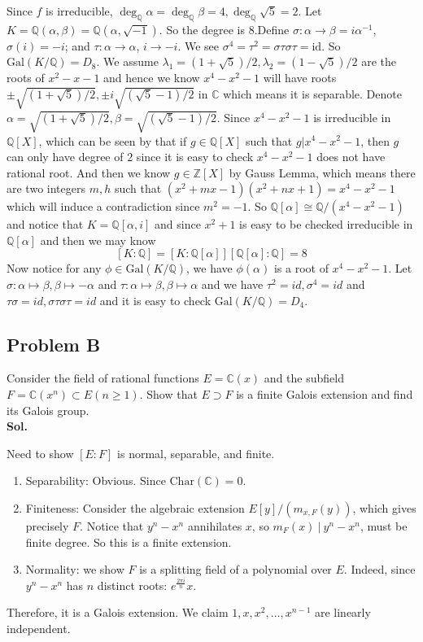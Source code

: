 \documentclass[lang=en,11pt,a4paper,citestyle =authoryear]{elegantpaper}
\newcommand{\Q}{\mathbb{Q}}
\begin{document}
Since $f$ is irreducible, $\deg_\Q\alpha=\deg_{\Q}\beta=4, \deg_\Q\sqrt{5}=2$. Let $K=\Q(\alpha,\beta)=\Q(\alpha,\sqrt{-1})$. So the degree is $8$.Define $\sigma: \alpha\rightarrow \beta=i\alpha^{-1}$, $\sigma(i)=-i$; and $\tau: \alpha\rightarrow\alpha$, $i\rightarrow -i$. 
We see $\sigma^4=\tau^2=\sigma\tau\sigma\tau=\text{id}$. So $\text{Gal}(K/\mathbb Q)=D_8$.
\fi
We assume $\lambda_1 = (1+\sqrt{5})/2,\lambda_2 = (1-\sqrt{5})/2$ are the roots of $x^2 - x - 1$ and hence we know $x^4-x^2-1$ will have roots $\pm\sqrt{(1+\sqrt{5})/2},\pm i\sqrt{(\sqrt{5}-1)/2}$ in $\mathbb{C}$ which means it is separable. Denote $\alpha =  \sqrt{(1+\sqrt{5})/2}, \beta = \sqrt{(\sqrt{5}-1)/2}$. Since $x^4 - x^2 - 1$ is irreducible in $\mathbb{Q}[X]$, which can be seen by that if $g\in \mathbb{Q}[X]$ such that $g|x^4 - x^2 - 1$, then $g$ can only have degree of $2$ since it is easy to check $x^4 - x^2 - 1$ does not have rational root. And then we know $g \in \mathbb{Z}[X]$ by Gauss Lemma, which means there are two integers $m,h$ such that $(x^2 + mx - 1)(x^2 + nx + 1) = x^4-x^2-1$ which will induce a contradiction since $m^2 = -1$. So $\mathbb{Q}[\alpha] \cong \mathbb{Q}/(x^4-x^2-1)$ and notice that $K = \mathbb{Q}[\alpha,i]$ and since $x^2 + 1$ is easy to be checked irreducible in $\mathbb{Q}[\alpha]$ and then we may know
\[
[K:\mathbb{Q}] = [K:\mathbb{Q}[\alpha]][\mathbb{Q}[\alpha]:\mathbb{Q}] = 8
\]
Now notice for any $\phi \in \text{Gal}(K/\mathbb{Q})$, we have $\phi(\alpha)$ is a root of $x^4-x^2-1$. Let $\sigma: \alpha \mapsto \beta, \beta \mapsto -\alpha$ and $\tau: \alpha \mapsto \beta, \beta\mapsto \alpha$ and we have $\tau^2 = id, \sigma^4 = id$ and $\tau\sigma = id, \sigma\tau\sigma\tau = id$ and it is easy to check $\text{Gal}(K/\mathbb{Q}) = D_4$. 
\par 


\subsection*{Problem B}
Consider the field of rational functions $E = \mathbb{C}(x)$ and the subfield $F = \mathbb{C}(x^n) \subset E (n \geq 1)$. Show that $E \supset F$ is a finite Galois extension and find its Galois group.
\vspace{0.5em}\\
\textbf{Sol.} \par
Need to show $[E:F]$ is normal, separable, and finite. 

\begin{enumerate}
    \item Separability: Obvious. Since $\text{Char}(\mathbb C)=0$.
    \item Finiteness: Consider the algebraic extension $E[y]/(m_{x,F}(y))$, which gives precisely $F$. Notice that $y^n-x^n$ annihilates $x$, so $m_F(x)\ |\ y^n-x^n$, must be finite degree. So this is a finite extension.
    \item Normality: we show $F$ is a splitting field of a polynomial over $E$. Indeed, since $y^n-x^n$ has $n$ distinct roots: $e^{\frac{2\pi i}{n}}x$.
\end{enumerate}
Therefore, it is a Galois extension. We claim $1,x,x^2,\dots,x^{n-1}$ are linearly independent. 
\end{document}

